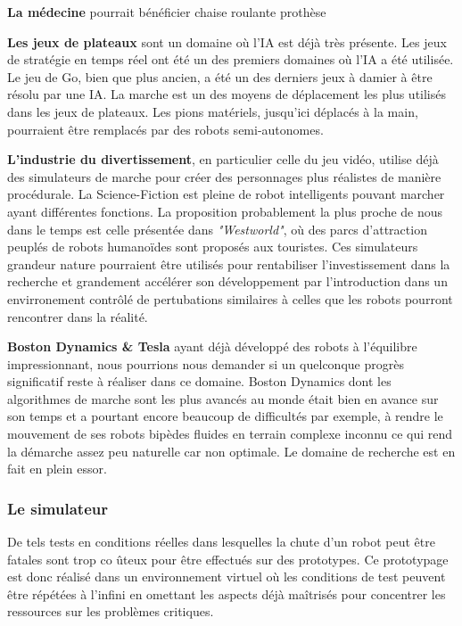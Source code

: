 \documentclass[journal, a4paper]{IEEEtran}
\begin{document}
	\textbf{La médecine} pourrait bénéficier chaise roulante prothèse

	\textbf{Les jeux de plateaux} sont un domaine où l'IA est
	déjà très présente. Les jeux de stratégie en temps réel
	ont été un des premiers domaines où l'IA a été utilisée.
	Le jeu de Go, bien que plus ancien, a été un des derniers
	jeux à damier à être résolu par une IA. La marche est un des
	moyens de déplacement les plus utilisés dans les jeux de
	plateaux. Les pions matériels, jusqu'ici déplacés à la main,
	pourraient être remplacés par des robots semi-autonomes.


	\textbf{L'industrie du divertissement}, en particulier celle du
	jeu vidéo,
	utilise déjà des simulateurs de marche pour créer des personnages
	plus réalistes de manière procédurale.
	La Science-Fiction est pleine de robot intelligents pouvant
	marcher ayant différentes fonctions.
	La proposition probablement la plus proche de nous dans le
	temps est celle présentée dans \textit{"Westworld"}, où des parcs
	d'attraction peuplés de robots humanoïdes sont proposés aux
	touristes. Ces simulateurs grandeur nature pourraient être
	utilisés pour rentabiliser l'investissement dans la recherche
	et grandement accélérer son développement par l'introduction dans
	un envirronement contrôlé de
	pertubations similaires à celles que les robots pourront rencontrer
	dans
	la réalité.

	\textbf{Boston Dynamics \& Tesla} ayant déjà développé des robots
	à l'équilibre impressionnant, nous pourrions nous demander si un
	quelconque progrès significatif reste à réaliser dans ce domaine.
	Boston Dynamics dont les algorithmes de marche sont les plus
	avancés au monde était bien en avance sur son temps et a pourtant
	encore beaucoup de difficultés par exemple, à rendre le mouvement
	de
	ses robots
	bipèdes fluides en terrain complexe inconnu ce qui rend la démarche
	assez peu naturelle car non optimale. Le
	domaine de recherche est en fait en plein essor.

	\subsubsection{Le simulateur}
	De tels tests en conditions réelles dans lesquelles la chute
	d'un robot peut être fatales sont trop co
	ûteux
	pour être effectués sur des prototypes.
	Ce prototypage est donc réalisé dans un environnement virtuel où les
	conditions de test peuvent être répétées à l'infini en omettant les
	aspects déjà maîtrisés pour concentrer les ressources sur les
	problèmes critiques.
\end{document}

